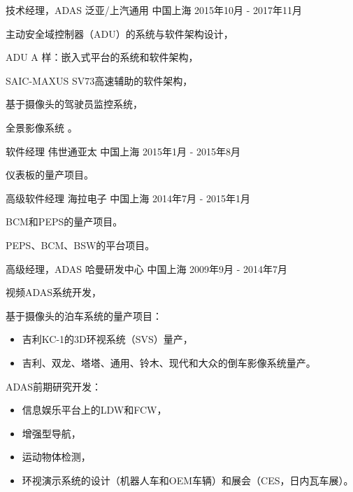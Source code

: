 \documentclass[../resume_cn.tex]{subfiles}
\begin{document}
\begin{cventries}
  \cventry
    {技术经理，ADAS} %
    {泛亚/上汽通用} %
    {中国上海} %
    {2015年10月 - 2017年11月} %
    {
      \begin{cvitems}
        \item 主动安全域控制器（ADU）的系统与软件架构设计，
        \item ADU A 样：嵌入式平台的系统和软件架构，
        \item SAIC-MAXUS SV73高速辅助的软件架构，
        \item 基于摄像头的驾驶员监控系统，
        \item 全景影像系统 \supercite{Xin_RearView_17}。
      \end{cvitems}
    }


  \cventry
    {软件经理} %
    {伟世通亚太} %
    {中国上海} %
    {2015年1月 - 2015年8月} %
    {
      \begin{cvitems}
        \item 仪表板的量产项目。
      \end{cvitems}
    }

  \cventry
    {高级软件经理} %
    {海拉电子} %
    {中国上海} %
    {2014年7月 - 2015年1月} %
    {
      \begin{cvitems}
        \item BCM和PEPS的量产项目。
        \item PEPS、BCM、BSW的平台项目。
      \end{cvitems}
    }

  \cventry
    {高级经理，ADAS} %
    {哈曼研发中心} %
    {中国上海} %
    {2009年9月 - 2014年7月} %
    {
      \begin{cvitems}
        \item 视频ADAS系统开发，
        \item 基于摄像头的泊车系统的量产项目：
          \begin{itemize}
            \item 吉利KC-1的3D环视系统（SVS）量产，
            \item 吉利、双龙、塔塔、通用、铃木、现代和大众的倒车影像系统量产。
           \end{itemize}
        \item ADAS前期研究开发：
          \begin{itemize}
            \item 信息娱乐平台上的LDW和FCW，
            \item 增强型导航，
            \item 运动物体检测，
            \item 环视演示系统的设计（机器人车和OEM车辆）和展会（CES，日内瓦车展）。
          \end{itemize}
      \end{cvitems}
    }
\end{cventries}
\end{document}
